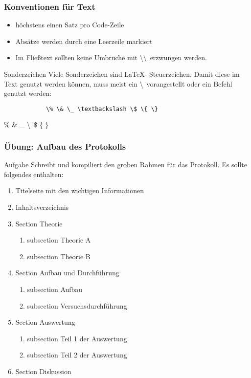 \begin{frame}[fragile]
    \frametitle{Konventionen für Text}
    \begin{itemize}
        \item höchstens einen Satz pro Code-Zeile
        \item Absätze werden durch eine Leerzeile markiert
        \item Im Fließtext sollten keine Umbrüche mit \textbackslash\textbackslash \  erzwungen werden.
    \end{itemize}
    \begin{alertblock}{Sonderzeichen}
        Viele Sonderzeichen sind \LaTeX- Steuerzeichen. Damit diese im Text genutzt werden können,
        muss meist ein \textbackslash \ vorangestellt oder ein Befehl genutzt werden:
        \begin{center}
            \begin{lstlisting}
            \% \& \_ \textbackslash \$ \{ \}
            \end{lstlisting}
            \% \& \_ \textbackslash \ \$ \{ \}
        \end{center}
    \end{alertblock}
\end{frame}
\begin{frame}
    \frametitle{Übung: Aufbau des Protokolls}
    \begin{block}{Aufgabe}
        Schreibt und kompiliert den groben Rahmen für das Protokoll.
        Es sollte folgendes enthalten:
        \begin{enumerate}
            \item Titelseite mit den wichtigen Informationen
            \item Inhaltsverzeichnis
            \item Section Theorie
                \begin{enumerate}
                    \item subsection Theorie A
                    \item subsection Theorie B
                \end{enumerate}
            \item Section Aufbau und Durchführung
                \begin{enumerate}
                    \item subsection Aufbau
                    \item subsection Versuchsdurchführung
                \end{enumerate}
            \item Section Auswertung
                \begin{enumerate}
                    \item subsection Teil 1 der Auswertung
                    \item subsection Teil 2 der Auswertung
                \end{enumerate}
            \item Section Diskussion
        \end{enumerate}
    \end{block}
\end{frame}

